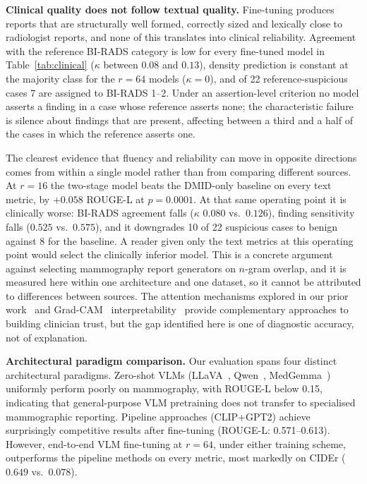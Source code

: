 \documentclass{wlscirep}
\begin{document}
\textbf{Clinical quality does not follow textual quality.} Fine-tuning produces reports that are structurally well formed, correctly sized and lexically close to radiologist reports, and none of this translates into clinical reliability. Agreement with the reference BI-RADS category is low for every fine-tuned model in Table~\ref{tab:clinical} ($\kappa$ between $0.08$ and $0.13$), density prediction is constant at the majority class for the $r=64$ models ($\kappa = 0$), and of 22 reference-suspicious cases 7 are assigned to BI-RADS 1--2. Under an assertion-level criterion no model asserts a finding in a case whose reference asserts none; the characteristic failure is silence about findings that are present, affecting between a third and a half of the cases in which the reference asserts one.

The clearest evidence that fluency and reliability can move in opposite directions comes from within a single model rather than from comparing different sources. At $r=16$ the two-stage model beats the DMID-only baseline on every text metric, by $+0.058$ ROUGE-L at $p=0.0001$. At that same operating point it is clinically worse: BI-RADS agreement falls ($\kappa$ $0.080$ vs.\ $0.126$), finding sensitivity falls ($0.525$ vs.\ $0.575$), and it downgrades 10 of 22 suspicious cases to benign against 8 for the baseline. A reader given only the text metrics at this operating point would select the clinically inferior model. This is a concrete argument against selecting mammography report generators on $n$-gram overlap, and it is measured here within one architecture and one dataset, so it cannot be attributed to differences between sources. The attention mechanisms explored in our prior work~\cite{esen2025multitask} and Grad-CAM~\cite{selvaraju2017gradcam} interpretability~\cite{esen2025rl} provide complementary approaches to building clinician trust, but the gap identified here is one of diagnostic accuracy, not of explanation.

\textbf{Architectural paradigm comparison.} Our evaluation spans four distinct architectural paradigms. Zero-shot VLMs (LLaVA~\cite{liu2024llava}, Qwen~\cite{bai2025qwen25vl, bai2025qwen3vl}, MedGemma~\cite{lin2024medgemma}) uniformly perform poorly on mammography, with ROUGE-L below 0.15, indicating that general-purpose VLM pretraining does not transfer to specialised mammographic reporting. Pipeline approaches (CLIP+GPT2) achieve surprisingly competitive results after fine-tuning (ROUGE-L: 0.571--0.613). However, end-to-end VLM fine-tuning at $r=64$, under either training scheme, outperforms the pipeline methods on every metric, most markedly on CIDEr ($0.649$ vs.\ $0.078$).
\end{document}
